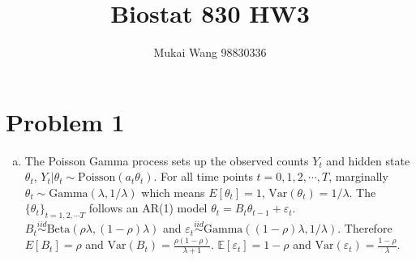 \documentclass[12pt]{article}
\title{Biostat 830 HW3}
\date{}
\author{Mukai Wang 98830336}
\begin{document}
\maketitle

\section*{Problem 1}

\begin{enumerate}[(a)]

\item  The Poisson Gamma process sets up the observed counts $Y_t$ and hidden state $\theta_t$, $\left.Y_t\right\vert\theta_t \sim \text{Poisson}(a_t \theta_t)$. For all time points $t=0,1,2,\cdots, T$, marginally $\theta_t \sim \text{Gamma}(\lambda, 1/\lambda)$ which means $E[\theta_t] = 1$, $\text{Var}(\theta_t)=1/\lambda$. The $\{\theta_t \}_{t=1,2,\cdots T}$ follows an AR(1) model $\theta_t = B_t \theta_{t-1}+\varepsilon_t$. $B_t \stackrel{iid}{\sim} \text{Beta}(\rho\lambda, (1-\rho)\lambda)$ and $\varepsilon_{t} \stackrel{iid}{\sim} \text{Gamma}((1-\rho)\lambda, 1/\lambda)$. Therefore $E[B_t] = \rho$ and $\text{Var}(B_t) = \frac{\rho (1-\rho)}{\lambda + 1}$. $\mathbb{E}[\varepsilon_t] = 1-\rho$ and $\text{Var}(\varepsilon_t) = \frac{1 - \rho}{\lambda}$.


\end{enumerate}
\end{document}
